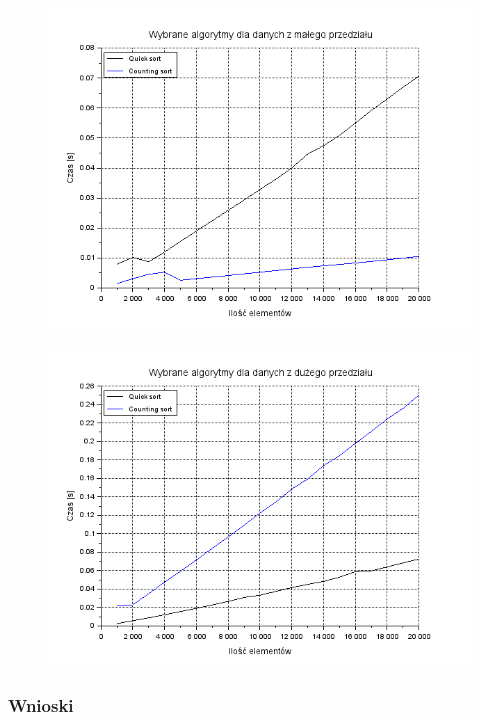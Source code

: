 \documentclass{article}
\begin{document}
\begin{figure}[h]
\centering
\begin{minipage}{.5\textwidth}
  \centering
  \includegraphics[width=1\linewidth]{male}
  \label{fig:male}
\end{minipage}%
\begin{minipage}{.5\textwidth}
  \centering
				\includegraphics[width=1\linewidth]{duze}
  \label{fig:duze}
\end{minipage}
\end{figure}

\subsubsection{Wnioski}
\end{document}
